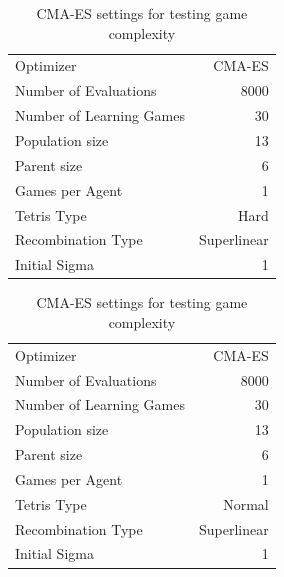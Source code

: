 \begin{table}[h]
\centering
\begin{tabular}{l r}
Optimizer & CMA-ES\\
Number of Evaluations & 8000\\
Number of Learning Games & 30\\
Population size& 13\\
Parent size & 6\\
Games per Agent & 1\\
Tetris Type & Hard\\
\hline
Recombination Type & Superlinear\\
Initial Sigma & 1
\end{tabular}
\quad
\begin{tabular}{l r}
Optimizer & CMA-ES\\
Number of Evaluations & 8000\\
Number of Learning Games & 30\\
Population size& 13\\
Parent size & 6\\
Games per Agent & 1\\
Tetris Type & Normal\\
\hline
Recombination Type & Superlinear\\
Initial Sigma & 1
\end{tabular}
\caption{CMA-ES settings for testing game complexity}
\end{table}

\clearpage

